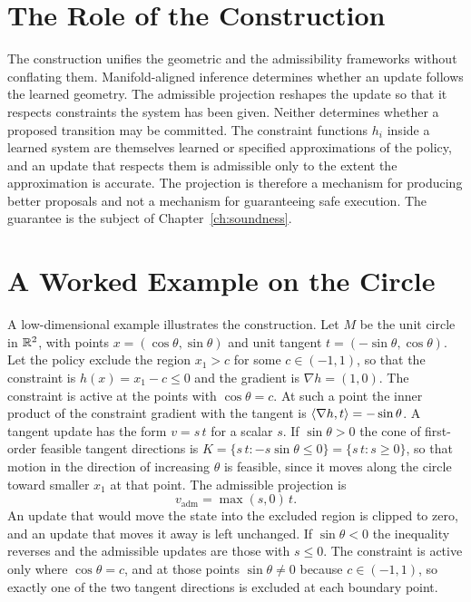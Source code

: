 \section{The Role of the Construction}

The construction unifies the geometric and the admissibility frameworks without conflating them. Manifold-aligned inference determines whether an update follows the learned geometry. The admissible projection reshapes the update so that it respects constraints the system has been given. Neither determines whether a proposed transition may be committed. The constraint functions $h_i$ inside a learned system are themselves learned or specified approximations of the policy, and an update that respects them is admissible only to the extent the approximation is accurate. The projection is therefore a mechanism for producing better proposals and not a mechanism for guaranteeing safe execution. The guarantee is the subject of Chapter~\ref{ch:soundness}.

\section{A Worked Example on the Circle}

A low-dimensional example illustrates the construction. Let $M$ be the unit circle in $\mathbb{R}^2$, with points $x=(\cos\theta,\sin\theta)$ and unit tangent $t=(-\sin\theta,\cos\theta)$. Let the policy exclude the region $x_1>c$ for some $c\in(-1,1)$, so that the constraint is $h(x)=x_1-c\le0$ and the gradient is $\nabla h=(1,0)$. The constraint is active at the points with $\cos\theta=c$. At such a point the inner product of the constraint gradient with the tangent is $\langle \nabla h,t\rangle=-\sin\theta$. A tangent update has the form $v=s\,t$ for a scalar $s$. If $\sin\theta>0$ the cone of first-order feasible tangent directions is $K=\{s\,t: -s\sin\theta\le0\}=\{s\,t:s\ge0\}$, so that motion in the direction of increasing $\theta$ is feasible, since it moves along the circle toward smaller $x_1$ at that point. The admissible projection is
\[
v_{\mathrm{adm}}=\max(s,0)\,t.
\]
An update that would move the state into the excluded region is clipped to zero, and an update that moves it away is left unchanged. If $\sin\theta<0$ the inequality reverses and the admissible updates are those with $s\le0$. The constraint is active only where $\cos\theta=c$, and at those points $\sin\theta\neq0$ because $c\in(-1,1)$, so exactly one of the two tangent directions is excluded at each boundary point.

